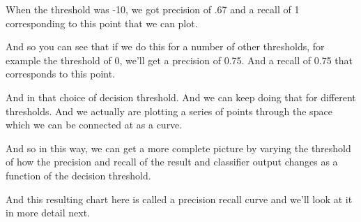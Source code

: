 \begin{multicols}{2}
When the threshold was -10, we got precision of .67 and a recall of 1 corresponding to this point that we can plot. 

And so you can see that if we do this for a number of other thresholds, for example the threshold of 0, we'll get a precision of 0.75. And a recall of 0.75 that corresponds to this point. 

And in that choice of decision threshold. And we can keep doing that for different thresholds. And we actually are plotting a series of points through the space which we can be connected at as a curve. 

And so in this way, we can get a more complete picture by varying the threshold of how the precision and recall of the result and classifier output changes as a function of the decision threshold. 

And this resulting chart here is called a precision recall curve and we'll look at it in more detail next. 

\end{multicols}